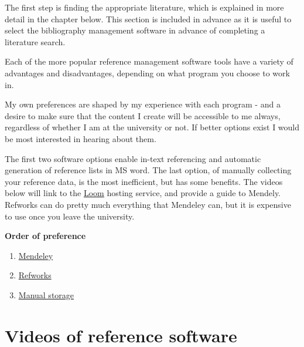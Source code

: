 \documentclass[
]{book}
\begin{document}
The first step is finding the appropriate literature, which is explained in more detail in the chapter below. This section is included in advance as it is useful to select the bibliography management software in advance of completing a literature search.

Each of the more popular reference management software tools have a variety of advantages and disadvantages, depending on what program you choose to work in.

My own preferences are shaped by my experience with each program - and a desire to make sure that the content I create will be accessible to me always, regardless of whether I am at the university or not. If better options exist I would be most interested in hearing about them.

The first two software options enable in-text referencing and automatic generation of reference lists in MS word. The last option, of manually collecting your reference data, is the most inefficient, but has some benefits. The videos below will link to the \href{https://www.loom.com}{Loom} hosting service, and provide a guide to Mendely. Refworks can do pretty much everything that Mendeley can, but it is expensive to use once you leave the university.

\textbf{\textbf{Order of preference}}

\begin{enumerate}
\def\labelenumi{\arabic{enumi}.}
\item
  \href{https://www.mendeley.com/download-desktop-new/}{Mendeley}
\item
  \href{https://www.aub.aau.dk/software-web/refworks/}{Refworks}
\item
  \href{https://youtu.be/JwXQb25cpqA}{Manual storage}
\end{enumerate}

\hypertarget{videos-of-reference-software}{%
\section{Videos of reference software}\label{videos-of-reference-software}}
\end{document}
